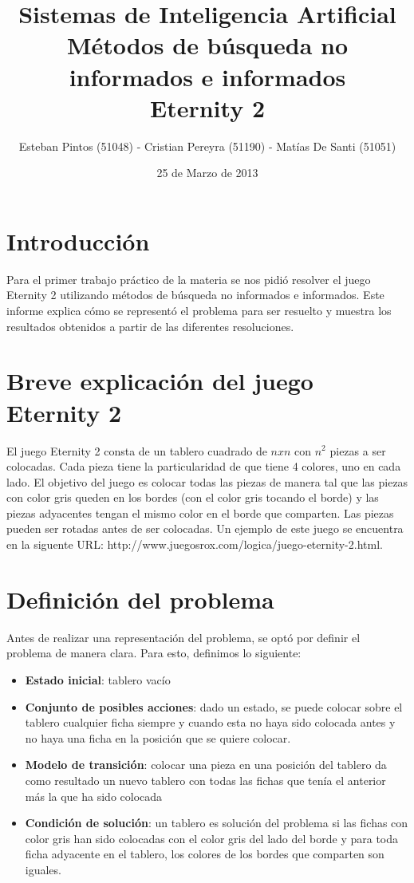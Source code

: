\documentclass[11pt,twocolumn]{article}
\title{Sistemas de Inteligencia Artificial\\
Métodos de búsqueda no informados e informados\\
Eternity 2}
\author{Esteban Pintos (51048) - Cristian Pereyra (51190) - Matías De Santi (51051)}
\date{25 de Marzo de 2013}
\begin{document}
\maketitle

\section{Introducción}
\par Para el primer trabajo práctico de la materia se nos pidió resolver el juego Eternity 2 utilizando métodos de búsqueda no informados e informados. Este informe explica cómo se representó el problema para ser resuelto y muestra los resultados obtenidos a partir de las diferentes resoluciones.

\section{Breve explicación del juego Eternity 2}
\par El juego Eternity 2 consta de un tablero cuadrado de $nxn$ con $n^2$ piezas a ser colocadas. Cada pieza tiene la particularidad de que tiene 4 colores, uno en cada lado. El objetivo del juego es colocar todas las piezas de manera tal que las piezas con color gris queden en los bordes (con el color gris tocando el borde) y las piezas adyacentes tengan el mismo color en el borde que comparten. Las piezas pueden ser rotadas antes de ser colocadas. Un ejemplo de este juego se encuentra en la siguente URL: http://www.juegosrox.com/logica/juego-eternity-2.html.

\section{Definición del problema}
\par Antes de realizar una representación del problema, se optó por definir el problema de manera clara. Para esto, definimos lo siguiente:
    \begin{itemize}
        \item \textbf{Estado inicial}: tablero vacío
		\item \textbf{Conjunto de posibles acciones}: dado un estado, se puede colocar sobre el tablero cualquier ficha siempre y cuando esta no haya sido colocada antes y no haya una ficha en la posición que se quiere colocar.
		\item \textbf{Modelo de transición}: colocar una pieza en una posición del tablero da como resultado un nuevo tablero con todas las fichas que tenía el anterior más la que ha sido colocada
		\item \textbf{Condición de solución}: un tablero es solución del problema si las fichas con color gris han sido colocadas con el color gris del lado del borde y para toda ficha adyacente en el tablero, los colores de los bordes que comparten son iguales.
	\end{itemize}
    
\end{document}
